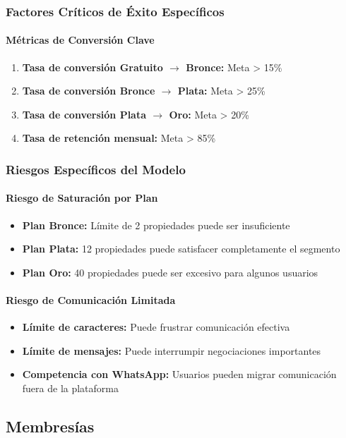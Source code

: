 		\subsubsection{Factores Críticos de Éxito Específicos}
			\paragraph{Métricas de Conversión Clave}
			\begin{enumerate}
				\item \textbf{Tasa de conversión Gratuito $\rightarrow$ Bronce:} Meta > 15\%
				\item \textbf{Tasa de conversión Bronce $\rightarrow$ Plata:} Meta > 25\%
				\item \textbf{Tasa de conversión Plata $\rightarrow$ Oro:} Meta > 20\%
				\item \textbf{Tasa de retención mensual:} Meta > 85\%
			\end{enumerate}
	
	\subsubsection{Riesgos Específicos del Modelo}
		\paragraph{Riesgo de Saturación por Plan}
		\begin{itemize}
			\item \textbf{Plan Bronce:} Límite de 2 propiedades puede ser insuficiente
			\item \textbf{Plan Plata:} 12 propiedades puede satisfacer completamente el segmento
			\item \textbf{Plan Oro:} 40 propiedades puede ser excesivo para algunos usuarios
		\end{itemize}
	
		\paragraph{Riesgo de Comunicación Limitada}
		\begin{itemize}
			\item \textbf{Límite de caracteres:} Puede frustrar comunicación efectiva
			\item \textbf{Límite de mensajes:} Puede interrumpir negociaciones importantes
			\item \textbf{Competencia con WhatsApp:} Usuarios pueden migrar comunicación fuera de la plataforma
		\end{itemize}
	
	\newpage
	\subsection{Membresías}
			 